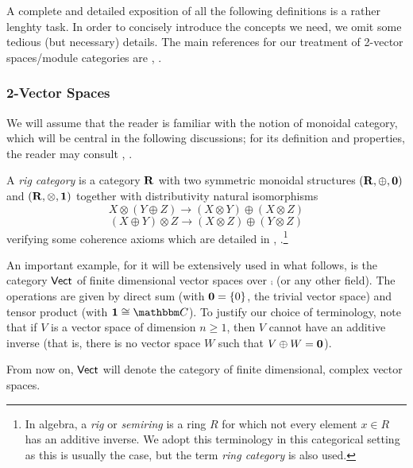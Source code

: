 A complete and detailed exposition of all the following definitions is a rather lenghty task. In order to concisely introduce the concepts we need, we omit some tedious (but necessary) details. The main references for our treatment of 2-vector spaces/module categories are \cite{kn:kv}, \cite{yetter:_cla}.


\subsubsection{2-Vector Spaces}

We will assume that the reader is familiar with the notion of monoidal category, which will be central in the following discussions; for its definition and properties, the reader may consult \cite{maclane:_catwm}, \cite{kelly:_enriched}.
\begin{defi}
A \emph{rig category} is a category ${\bf R}$ with two symmetric monoidal structures $({\bf R},\oplus ,{\bf 0})$ and $({\bf R},\otimes ,{\bf 1})$ together with distributivity natural isomorphisms
$$X\otimes (Y\oplus Z)\longrightarrow (X\otimes Y)\oplus (X\otimes Z)$$
$$(X\oplus Y)\otimes Z\longrightarrow (X\otimes Z)\oplus (Y\otimes Z)$$
verifying some coherence axioms which are detailed in \cite{laplaza:_coh1}, \cite{kelly:_coh2}.\footnote{In algebra, a \emph{rig} or \emph{semiring} is a ring $R$ for which not every element $x\in R$ has an additive inverse. We adopt this terminology in this categorical setting as this is usually the case, but the term \emph{ring category} is also used.}
\end{defi}

An important example, for it will be extensively used in what follows, is the category $\mathsf{Vect}$ of finite dimensional vector spaces over $\comp$ (or any other field). The operations are given by direct sum (with ${\bf 0}=\{0\}$, the trivial vector space) and tensor product (with ${\bf 1}\cong \comp$). To justify our choice of terminology, note that if $V$ is a vector space of dimension $n\geqslant 1$, then $V$ cannot have an additive inverse (that is, there is no vector space $W$ such that $V\oplus W={\bf 0}$).

\begin{notation}
From now on, $\mathsf{Vect}$ will denote the category of finite dimensional, complex vector spaces.
\end{notation}

